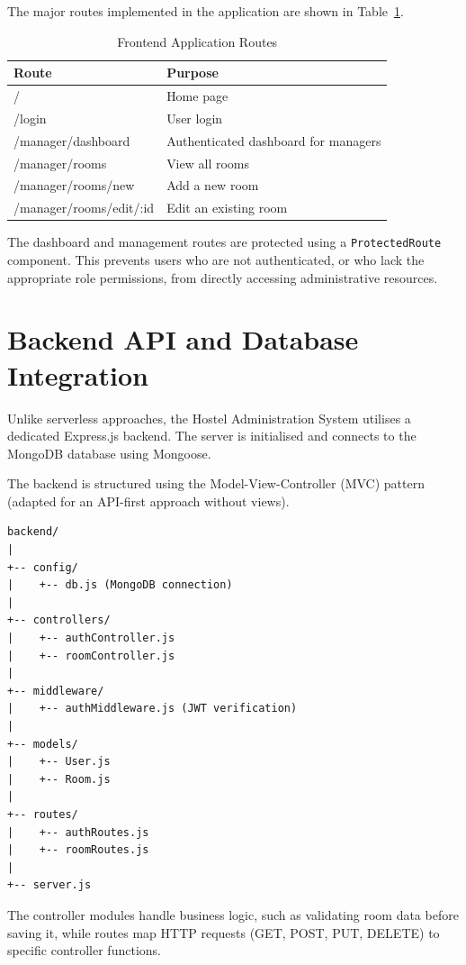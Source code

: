The major routes implemented in the application are shown in Table~\ref{tab:routes}.

\begin{table}[H]
\centering
\caption{Frontend Application Routes}
\label{tab:routes}
\begin{tabular}{p{} p{}}
\toprule
\textbf{Route} & \textbf{Purpose} \\
\midrule
/ & Home page \\
/login & User login \\
/manager/dashboard & Authenticated dashboard for managers \\
/manager/rooms & View all rooms \\
/manager/rooms/new & Add a new room \\
/manager/rooms/edit/:id & Edit an existing room \\
\bottomrule
\end{tabular}
\end{table}

The dashboard and management routes are protected using a \texttt{ProtectedRoute} component. This prevents users who are not authenticated, or who lack the appropriate role permissions, from directly accessing administrative resources.

\section{Backend API and Database Integration}

Unlike serverless approaches, the Hostel Administration System utilises a dedicated Express.js backend. The server is initialised and connects to the MongoDB database using Mongoose.

The backend is structured using the Model-View-Controller (MVC) pattern (adapted for an API-first approach without views).

\begin{verbatim}
backend/
|
+-- config/
|    +-- db.js (MongoDB connection)
|
+-- controllers/
|    +-- authController.js
|    +-- roomController.js
|
+-- middleware/
|    +-- authMiddleware.js (JWT verification)
|
+-- models/
|    +-- User.js
|    +-- Room.js
|
+-- routes/
|    +-- authRoutes.js
|    +-- roomRoutes.js
|
+-- server.js
\end{verbatim}

The controller modules handle business logic, such as validating room data before saving it, while routes map HTTP requests (GET, POST, PUT, DELETE) to specific controller functions.

